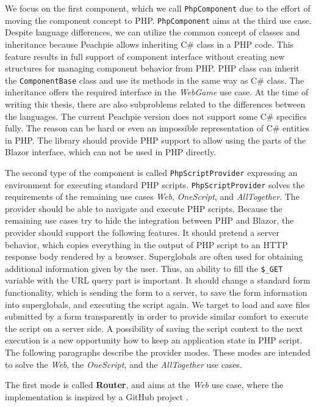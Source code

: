 \par
We focus on the first component, which we call \texttt{PhpComponent} due to the effort of moving the component concept to PHP.
\texttt{PhpComponent} aims at the third use case.
Despite language differences, we can utilize the common concept of classes and inheritance because Peachpie allows inheriting C\# class in a PHP code.
This feature results in full support of component interface without creating new structures for managing component behavior from PHP.
PHP class can inherit the \texttt{ComponentBase} class and use its methods in the same way as C\# class.
The inheritance offers the required interface in the \textit{WebGame} use case.
At the time of writing this thesis, there are also subproblems related to the differences between the languages.
The current Peachpie version does not support some C\# specifics fully.
The reason can be hard or even an impossible representation of C\# entities in PHP.
The library should provide PHP support to allow using the parts of the Blazor interface, which can not be used in PHP directly.
\par
The second type of the component is called \texttt{PhpScriptProvider} expressing an environment for executing standard PHP scripts.
\texttt{PhpScriptProvider} solves the requirements of the remaining use cases \textit{Web}, \textit{OneScript}, and \textit{AllTogether}.
The provider should be able to navigate and execute PHP scripts.
Because the remaining use cases try to hide the integration between PHP and Blazor, the provider should support the following features.
It should pretend a server behavior, which copies everything in the output of PHP script to an HTTP response body rendered by a browser.
Superglobals are often used for obtaining additional information given by the user.
Thus, an ability to fill the \texttt{\$\_GET} variable with the URL query part is important.
It should change a standard form functionality, which is sending the form to a server, to save the form information into superglobals, and executing the script again.
We target to load and save files submitted by a form transparently in order to provide similar comfort to execute the script on a server side.
A possibility of saving the script context to the next execution is a new opportunity how to keep an application state in PHP script.
The following paragraphs describe the provider modes.
These modes are intended to solve the \textit{Web}, the \textit{OneScript}, and the \textit{AllTogether} use cases. 
\par
The first mode is called \textbf{Router}, and aims at the \textit{Web} use case, where the implementation is inspired by a GitHub project \cite{online:customRouter}.

